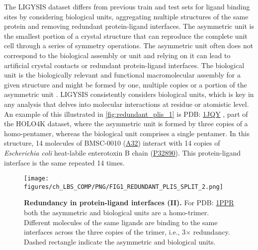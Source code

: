 The LIGYSIS dataset differs from previous train and test sets for ligand binding sites by considering biological units, aggregating multiple structures of the same protein and removing redundant protein-ligand interfaces. The asymmetric unit is the smallest portion of a crystal structure that can reproduce the complete unit cell through a series of symmetry operations. The asymmetric unit often does not correspond to the biological assembly or unit and relying on it can lead to artificial crystal contacts or redundant protein-ligand interfaces. The biological unit is the biologically relevant and functional macromolecular assembly for a given structure and might be formed by one, multiple copies or a portion of the asymmetric unit \cite{XU_2019_ASSEMBLIES}. LIGYSIS consistently considers biological units, which is key in any analysis that delves into molecular interactions at residue or atomistic level. An example of this illustrated in \autoref{fig:redundant_plis_1} is PDB: \href{https://www.ebi.ac.uk/pdbe/entry/pdb/1jqy}{1JQY} \cite{PICKENS_2002_ANCHOR}, part of the HOLO4K dataset, where the asymmetric unit is formed by three copies of a homo-pentamer, whereas the biological unit comprises a single pentamer. In this structure, 14 molecules of BMSC-0010 (\href{https://www.rcsb.org/ligand/A32}{A32}) interact with 14 copies of \textit{Escherichia coli} heat-labile enterotoxin B chain (\href{https://www.uniprot.org/uniprotkb/P32890/entry}{P32890}). This protein-ligand interface is the same repeated 14 times.

\FloatBarrier

\begin{figure}[htb!]
    \centering
    \texttt{[image: figures/ch\_LBS\_COMP/PNG/FIG1\_REDUNDANT\_PLIS\_SPLIT\_2.png]}
    \caption[Redundancy in protein-ligand interfaces (II)]{\textbf{Redundancy in protein-ligand interfaces (II).} For PDB: \href{https://www.ebi.ac.uk/pdbe/entry/pdb/1PPR}{1PPR} both the asymmetric and biological units are a homo-trimer. Different molecules of the same ligands are binding to the same interfaces across the three copies of the trimer, i.e., 3$\times$ redundancy. Dashed rectangle indicate the asymmetric and biological units.}
    \label{fig:redundant_plis_2}
\end{figure}

